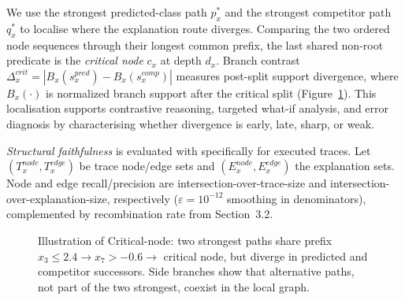 \documentclass[runningheads]{llncs}
\begin{document}
We use the strongest predicted-class path $p_x^\ast$ and the strongest competitor path $q_x^\ast$ to localise where the explanation route diverges. Comparing the two ordered node sequences through their longest common prefix, the last shared non-root predicate is the \emph{critical node} $c_x$ at depth $d_x$. Branch contrast $\Delta_x^{crit}=|B_x(s_x^{pred})-B_x(s_x^{comp})|$ measures post-split support divergence, where $B_x(\cdot)$ is normalized branch support after the critical split (Figure~\ref{fig:critical-node-example}). This localisation supports contrastive reasoning, targeted what-if analysis, and error diagnosis by characterising whether divergence is early, late, sharp, or weak.

\textit{Structural faithfulness} is evaluated with specifically for executed traces. Let $(T_x^{node},T_x^{edge})$ be trace node/edge sets and $(E_x^{node},E_x^{edge})$ the explanation sets. Node and edge recall/precision are intersection-over-trace-size and intersection-over-explanation-size, respectively ($\varepsilon=10^{-12}$ smoothing in denominators), complemented by recombination rate from Section~3.2.

\begin{figure}[h]
\centering
{}
\caption{Illustration of Critical-node: two strongest paths share prefix $x_3 \le 2.4 \to x_7 > -0.6 \to$ critical node, but diverge in predicted and competitor successors. Side branches show that alternative paths, not part of the two strongest,  coexist in the local graph.}
\label{fig:critical-node-example}
\end{figure}
\end{document}
